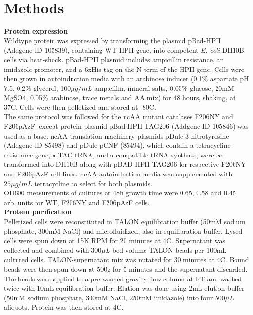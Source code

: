 \documentclass[journal=jacsat,manuscript=article]{achemso}
\begin{document}
\section{Methods}
\textbf{Protein expression}\\
Wildtype protein was expressed by transforming the plasmid pBad-HPII (Addgene ID 105839), containing WT HPII gene, into competent \textit{E. coli} DH10B cells via heat-shock. pBad-HPII plasmid includes ampicillin resistance, an imidazole promoter, and a 6xHis tag on the N-term of the HPII gene. Cells were then grown in autoinduction media with an arabinose inducer (0.1\% aspartate pH 7.5, 0.2\% glycerol, 100$\mu g / mL$ ampicillin, mineral salts, 0.05\% glucose, 20mM MgSO4, 0.05\% arabinose, trace metals and AA mix) for 48 hours, shaking, at 37C. Cells were then pelletized and stored at -80C.\\

The same protocol was followed for the ncAA mutant catalases F206NY and F206pAzF, except protein plasmid pBad-HPII TAG206 (Addgene ID 105846) was used as a base. ncAA translation machinery plasmids pDule-3-nitrotyrosine (Addgene ID 85498) and pDule-pCNF (85494), which contain a tetracycline resistance gene, a TAG tRNA, and a compatible tRNA synthase, were co-transformed into DH10B along with pBAD-HPII TAG206 for respective F206NY and F206pAzF cell lines. ncAA autoinduction media was supplemented with $25\mu g / mL$ tetracycline to select for both plasmids.\\

OD600 measurements of cultures at 48h growth time were 0.65, 0.58 and 0.45 arb. units for WT, F206NY and F206pAzF cells.\\

\textbf{Protein purification}\\
Pelletized cells were reconstituted in TALON equilibration buffer (50mM sodium phosphate, 300mM NaCl) and microfluidized, also in equilibration buffer. Lysed cells were spun down at 15K RPM for 20 minutes at 4C. Supernatant was collected and combined with 300$\mu L$ bed volume TALON beads per 100mL cultured cells. TALON-supernatant mix was nutated for 30 minutes at 4C. Bound beads were then spun down at 500g for 5 minutes and the supernatant discarded. The beads were applied to a pre-washed gravity-flow column at RT and washed twice with 10mL equilibration buffer. Elution was done using 2mL elution buffer (50mM sodium phosphate, 300mM NaCl, 250mM imidazole) into four 500$\mu L$ aliquots. Protein was then stored at 4C.\\
\end{document}
